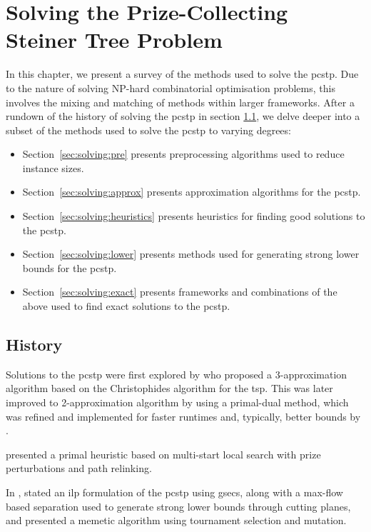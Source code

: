 \chapter{Solving the Prize-Collecting Steiner Tree Problem}
\label{chap:solving}

In this chapter, we present a survey of the methods used to solve the \gls{pcstp}. Due to the nature of solving
NP-hard combinatorial optimisation problems, this involves the mixing and matching of methods within larger frameworks.
After a rundown of the history of solving the \gls{pcstp} in section \ref{sec:solving:history}, we
delve deeper into a subset of the methods used to solve the \gls{pcstp} to varying degrees:
\begin{itemize}
\item Section~\ref{sec:solving:pre} presents preprocessing algorithms used to reduce instance sizes.
\item Section~\ref{sec:solving:approx} presents approximation algorithms for the \gls{pcstp}.
\item Section~\ref{sec:solving:heuristics} presents heuristics for finding good solutions to the \gls{pcstp}.
\item Section~\ref{sec:solving:lower} presents methods used for generating strong lower bounds for the \gls{pcstp}.
\item Section~\ref{sec:solving:exact} presents frameworks and combinations of the above used to find exact solutions
   to the \gls{pcstp}.
\end{itemize}

\section{History}
\label{sec:solving:history}

Solutions to the \gls{pcstp} were first explored by \citet{Bienstock1993} who
proposed a 3-approximation algorithm based on the Christophides algorithm for the \gls{tsp}.
This was later improved to 2-approximation algorithm by
\citet{goemans1997primal} using a primal-dual method,
which was refined and implemented
for faster runtimes and, typically, better
bounds by \citet{Johnson:2000:PCS:338219.338637}.

\citet{canuto2001local} presented a primal heuristic based on multi-start
local search with prize perturbations and path relinking.

 In \citeyear{lucena2004strong}, \citet{lucena2004strong} stated an \gls{ilp} formulation of the \gls{pcstp} using \glspl{gsec},
along with a max-flow based separation used to generate strong lower bounds through cutting planes, and
\citet{Ljubic:2004:memetic}
 presented a memetic algorithm using tournament selection and mutation.

